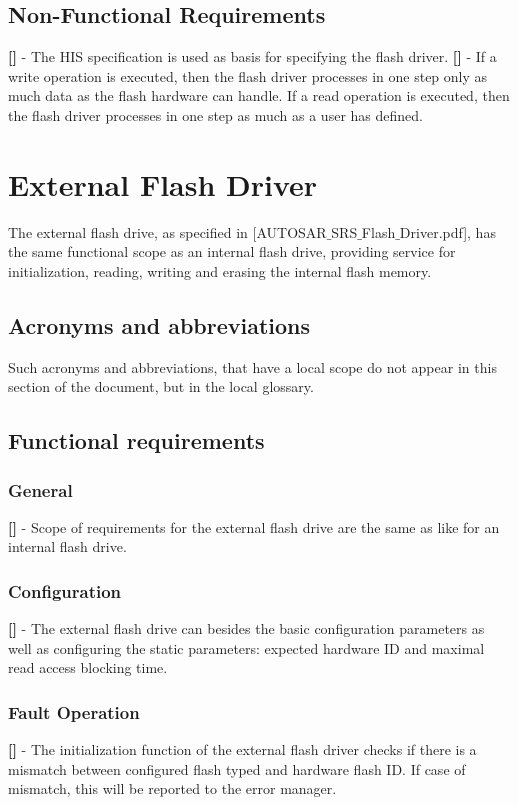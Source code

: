 \subsection{Non-Functional Requirements}
{\bf []} - The \mbox{HIS} specification is used as basis for specifying the flash driver.\newline
\newline
{\bf []} - If a write operation is executed, then the flash driver processes in one step only as much data as the flash hardware can handle. If a read operation is executed, then the flash driver processes in one step as much as a user has defined.

\newpage
\section{External Flash Driver}
The external flash drive, as specified in  [AUTOSAR$\_$SRS$\_$Flash$\_$Driver.pdf],  has the same functional scope as an internal flash drive, providing service for initialization, reading, writing and erasing the internal flash memory.
\subsection{Acronyms and abbreviations}
Such acronyms and abbreviations, that have a local scope do not appear in this section of the document, but in the local glossary.
\subsection{Functional requirements}
\subsubsection{General}
{\bf []} - Scope of requirements for the external flash drive are the same as like for an internal flash drive.
\subsubsection{Configuration}
{\bf []} - The external flash drive can besides the basic configuration parameters as well as configuring the static parameters: expected hardware ID and maximal read access blocking time.
\subsubsection{Fault Operation}
{\bf []} - The initialization function of the external flash driver checks if there is a mismatch between configured flash typed and hardware flash ID. If case of mismatch, this will be reported to the error manager.
